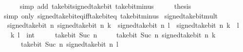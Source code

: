 \begin{isabellebody}
\ \ \ \ \isamarkupfalse%
\ {\isacharparenleft}{\kern0pt}simp\ add{\isacharcolon}{\kern0pt}\ take{\isacharunderscore}{\kern0pt}bit{\isacharunderscore}{\kern0pt}signed{\isacharunderscore}{\kern0pt}take{\isacharunderscore}{\kern0pt}bit\ take{\isacharunderscore}{\kern0pt}bit{\isacharunderscore}{\kern0pt}minus{\isacharparenright}{\kern0pt}\isanewline
\ \ \isamarkupfalse%
\ \isamarkupfalse%
\ {\isacharquery}{\kern0pt}thesis\isanewline
\ \ \ \ \isamarkupfalse%
\ {\isacharparenleft}{\kern0pt}simp\ only{\isacharcolon}{\kern0pt}\ signed{\isacharunderscore}{\kern0pt}take{\isacharunderscore}{\kern0pt}bit{\isacharunderscore}{\kern0pt}eq{\isacharunderscore}{\kern0pt}iff{\isacharunderscore}{\kern0pt}take{\isacharunderscore}{\kern0pt}bit{\isacharunderscore}{\kern0pt}eq\ take{\isacharunderscore}{\kern0pt}bit{\isacharunderscore}{\kern0pt}minus{\isacharparenright}{\kern0pt}\isanewline
{}\isamarkupfalse%
%
\endisatagproof
{\isafoldproof}%
%
\isadelimproof
\isanewline
%
\endisadelimproof
\isanewline
{}\isamarkupfalse%
\ signed{\isacharunderscore}{\kern0pt}take{\isacharunderscore}{\kern0pt}bit{\isacharunderscore}{\kern0pt}mult{\isacharcolon}{\kern0pt}\isanewline
\ \ {\isacartoucheopen}signed{\isacharunderscore}{\kern0pt}take{\isacharunderscore}{\kern0pt}bit\ n\ {\isacharparenleft}{\kern0pt}signed{\isacharunderscore}{\kern0pt}take{\isacharunderscore}{\kern0pt}bit\ n\ k\ {\isacharasterisk}{\kern0pt}\ signed{\isacharunderscore}{\kern0pt}take{\isacharunderscore}{\kern0pt}bit\ n\ l{\isacharparenright}{\kern0pt}\ {\isacharequal}{\kern0pt}\ signed{\isacharunderscore}{\kern0pt}take{\isacharunderscore}{\kern0pt}bit\ n\ {\isacharparenleft}{\kern0pt}k\ {\isacharasterisk}{\kern0pt}\ l{\isacharparenright}{\kern0pt}{\isacartoucheclose}\isanewline
\ \ \ k\ l\ {\isacharcolon}{\kern0pt}{\isacharcolon}{\kern0pt}\ int\isanewline
%
\isadelimproof
%
\endisadelimproof
%
\isatagproof
{}\isamarkupfalse%
\ {\isacharminus}{\kern0pt}\isanewline
\ \ \isamarkupfalse%
\ {\isacartoucheopen}take{\isacharunderscore}{\kern0pt}bit\ {\isacharparenleft}{\kern0pt}Suc\ n{\isacharparenright}{\kern0pt}\isanewline
\ \ \ \ \ {\isacharparenleft}{\kern0pt}take{\isacharunderscore}{\kern0pt}bit\ {\isacharparenleft}{\kern0pt}Suc\ n{\isacharparenright}{\kern0pt}\ {\isacharparenleft}{\kern0pt}signed{\isacharunderscore}{\kern0pt}take{\isacharunderscore}{\kern0pt}bit\ n\ k{\isacharparenright}{\kern0pt}\ {\isacharasterisk}{\kern0pt}\isanewline
\ \ \ \ \ \ take{\isacharunderscore}{\kern0pt}bit\ {\isacharparenleft}{\kern0pt}Suc\ n{\isacharparenright}{\kern0pt}\ {\isacharparenleft}{\kern0pt}signed{\isacharunderscore}{\kern0pt}take{\isacharunderscore}{\kern0pt}bit\ n\ l{\isacharparenright}{\kern0pt}{\isacharparenright}{\kern0pt}\ {\isacharequal}{\kern0pt}\isanewline

\end{isabellebody}
